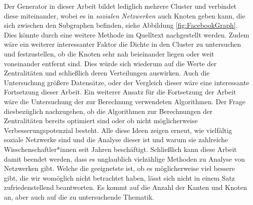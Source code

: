 Der Generator in dieser Arbeit bildet lediglich mehrere Cluster und verbindet diese miteinander, wobei es in \textit{sozialen Netzwerken} auch Knoten geben kann, die sich zwischen den Subgraphen befinden, siehe Abbildung \ref{fig:FacebookGraph}. Dies könnte durch eine weitere Methode im Quelltext nachgestellt werden. Zudem wäre ein weiterer interessanter Faktor die Dichte in den Cluster zu untersuchen und festzustellen, ob die Knoten sehr nah beieinander liegen oder weit voneinander entfernt sind. Dies würde sich wiederum auf die Werte der Zentralitäten und schließlich deren Verteilungen auswirken.
Auch die Untersuchung größere Datensätze, oder der Vergleich dieser wäre eine interessante Fortsetzung dieser Arbeit. Ein weiterer Ansatz für die Fortsetzung der Arbeit wäre die Untersuchung der zur Berechnung verwendeten Algorithmen. Der Frage diesbezüglich nachzugehen, ob die Algorithmen zur Berechnungen der Zentralitäten bereits optimiert sind oder ob nicht möglicherweise Verbesserungspotenzial besteht.  
Alle diese Ideen zeigen erneut, wie vielfältig soziale Netzwerke sind und die Analyse dieser ist und warum sie zahlreiche Wisschenschaftler*innen seit Jahren beschäftigt. Schließlich kann diese Arbeit damit beendet werden, dass es unglaublich vielzählige Methoden zu Analyse von Netzwerken gibt. Welche die geeignetste ist, ob es möglicherweise viel bessere gibt, die wir womöglich nicht betrachtet haben, lässt sich nicht in einem Satz zufriedenstellend beantworten. Es kommt auf die Anzahl der Kanten und Knoten an, aber auch auf die zu untersuchende Thematik.